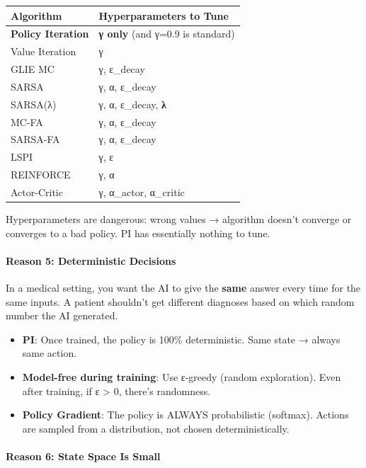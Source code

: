 \documentclass[
]{article}
\providecommand{\tightlist}{%
  \setlength{\itemsep}{0pt}\setlength{\parskip}{0pt}}
\begin{document}
\begin{longtable}[]{@{}ll@{}}
\toprule
Algorithm & Hyperparameters to Tune \\
\midrule
\endhead
\textbf{Policy Iteration} & \textbf{γ only} (and γ=0.9 is standard) \\
Value Iteration & γ \\
GLIE MC & γ, ε\_decay \\
SARSA & γ, α, ε\_decay \\
SARSA(λ) & γ, α, ε\_decay, \textbf{λ} \\
MC-FA & γ, α, ε\_decay \\
SARSA-FA & γ, α, ε\_decay \\
LSPI & γ, ε \\
REINFORCE & γ, α \\
Actor-Critic & γ, α\_actor, α\_critic \\
\bottomrule
\end{longtable}

Hyperparameters are dangerous: wrong values → algorithm doesn't converge
or converges to a bad policy. PI has essentially nothing to tune.

\hypertarget{reason-5-deterministic-decisions}{%
\paragraph{Reason 5: Deterministic
Decisions}\label{reason-5-deterministic-decisions}}

In a medical setting, you want the AI to give the \textbf{same} answer
every time for the same inputs. A patient shouldn't get different
diagnoses based on which random number the AI generated.

\begin{itemize}
\tightlist
\item
  \textbf{PI}: Once trained, the policy is 100\% deterministic. Same
  state → always same action.
\item
  \textbf{Model-free during training}: Use ε-greedy (random
  exploration). Even after training, if ε \textgreater{} 0, there's
  randomness.
\item
  \textbf{Policy Gradient}: The policy is ALWAYS probabilistic
  (softmax). Actions are sampled from a distribution, not chosen
  deterministically.
\end{itemize}

\hypertarget{reason-6-state-space-is-small}{%
\paragraph{Reason 6: State Space Is
Small}\label{reason-6-state-space-is-small}}
\end{document}
